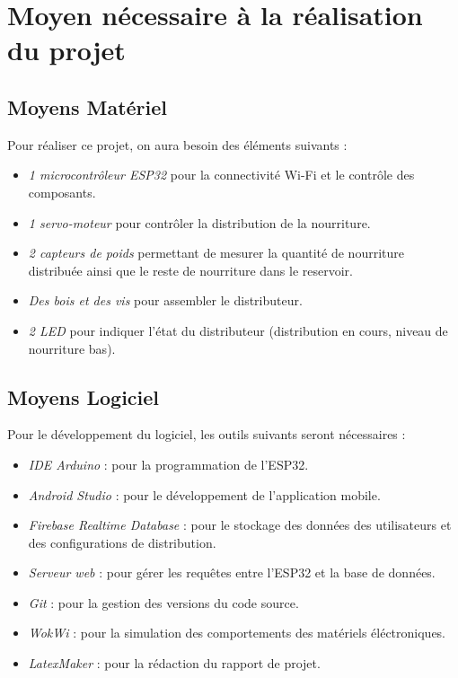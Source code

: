 \section{Moyen nécessaire à la réalisation du projet}
	\subsection{Moyens Matériel}
	Pour réaliser ce projet, on aura besoin des éléments suivants :
		\begin{itemize}
			\item \textit{1 microcontrôleur ESP32} pour la connectivité Wi-Fi et le contrôle des composants.
			\item \textit{1 servo-moteur} pour contrôler la distribution de la nourriture.
			\item \textit{2 capteurs de poids} permettant de mesurer la quantité de nourriture distribuée ainsi que le reste de nourriture dans le reservoir.
			\item \textit{Des bois et des vis} pour assembler le distributeur.
			\item \textit{2 LED} pour indiquer l'état du distributeur (distribution en cours, niveau de nourriture bas).
		\end{itemize}
	\subsection{Moyens Logiciel}
	Pour le développement du logiciel, les outils suivants seront nécessaires :
		\begin{itemize}
			\item \textit{IDE Arduino} : pour la programmation de l'ESP32.
			\item \textit{Android Studio} : pour le développement de l'application mobile.
			\item \textit{Firebase Realtime Database} : pour le stockage des données des utilisateurs et des configurations de distribution.
			\item \textit{Serveur web} : pour gérer les requêtes entre l'ESP32 et la base de données.
			\item \textit{Git} : pour la gestion des versions du code source.
			\item \textit{WokWi} : pour la simulation des comportements des matériels éléctroniques.
			\item \textit{LatexMaker} : pour la rédaction du rapport de projet.
		\end{itemize}
	
